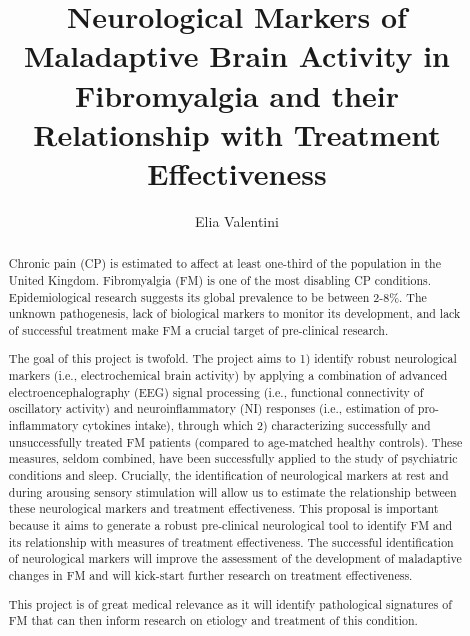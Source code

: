 \documentclass[twocolumn, serif, rga, numeric]{jote-article}
\title{Neurological Markers of Maladaptive Brain Activity in Fibromyalgia and their Relationship with Treatment Effectiveness}
\author[1]{Elia Valentini}
\affil[1]{Department of Psychology and Centre for Brain Science, University of Essex}
\begin{document}
    \begin{frontmatter}
    \maketitle
    \begin{abstract}
Chronic pain (CP) is estimated to affect at least one-third of the
population in the United Kingdom. Fibromyalgia (FM) is one of the most
disabling CP conditions. Epidemiological research suggests its global
prevalence to be between 2-8\%. The unknown pathogenesis, lack of
biological markers to monitor its development, and lack of successful
treatment make FM a crucial target of pre-clinical research.

The goal of this project is twofold. The project aims to 1) identify
robust neurological markers (i.e., electrochemical brain activity) by
applying a combination of advanced electroencephalography (EEG) signal
processing (i.e., functional connectivity of oscillatory activity) and
neuroinflammatory (NI) responses (i.e., estimation of pro-inflammatory
cytokines intake), through which 2) characterizing successfully and
unsuccessfully treated FM patients (compared to age-matched healthy
controls). These measures, seldom combined, have been successfully
applied to the study of psychiatric conditions and sleep. Crucially, the
identification of neurological markers at rest and during arousing
sensory stimulation will allow us to estimate the relationship between
these neurological markers and treatment effectiveness. This proposal is
important because it aims to generate a robust pre-clinical neurological
tool to identify FM and its relationship with measures of treatment
effectiveness. The successful identification of neurological markers
will improve the assessment of the development of maladaptive changes in
FM and will kick-start further research on treatment effectiveness.

This project is of great medical relevance as it will identify
pathological signatures of FM that can then inform research on etiology
and treatment of this condition.
    \end{abstract}
    \end{frontmatter}
\end{document}
